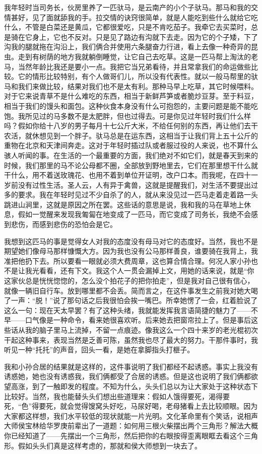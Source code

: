 我年轻时当司务长，伙房里养了一匹驮马，是云南产的小个子驮马。那马和我的交情甚好，见了面就舔我的手。拉交情的诀窍很简单，就是人能吃到些什么就给它吃什么，不管是白菜还是黄瓜，它都很爱吃，只是不肯吃茄子。我牵它去买菜时，总是骑在它身上，它也不反对。只是见了路边有沟就下去走。因为它的个子矮，下了沟我的腿就拖在沟沿上，我们俩合并使用六条腿奋力行进，看上去像一种奇异的昆虫。走到有树荫的地方我就躺倒睡觉，让它自己去吃草。这是一匹马帮上淘汰的老马，当然年龄比我还是要小一点。我把它当兄弟看待，并且常拿我们的命运做些比较。它的情形比较特别，有个人做哥们儿，所以没有代表性。就以一般马帮里的驮马和我们来做比较，结果对我们也不是太有利。那种马早上吃草，其它时候喂料。对于它来说青草不是什么难吃的东西，相当于新鲜芦笋或者脆炒豆芽。至于料豆，相当于我们的馒头和面包。这种伙食本身没有什么可抱怨的，主要问题是能不能吃饱。我所见过的马多数不是太肥胖，但也过得去。可是你见过年轻时我们什么样吗？假如你给十八岁的男子每月十七公斤大米，不给任何别的东西，再让他们去干农活，就休想见到一个胖子。驮马总是在运东西，这相当于让我们背上五十公斤的重物在北京和天津间奔走。这对于年轻时插过队或者服过役的人来说，也不算什么骇人听闻的事。在生活的一个最重要的方面，我们绝对不如它们，就是春天到来的时候，我们那里的马不论公母都不圈，全部放到野地里去，它们在那里想干什么就干什么，用不着送玫瑰花、也用不着到单位开证明，改户口本。而我呢，在四十一岁前没有过性生活。圣人云，人有异于禽兽，这就是提醒我们，对生活不要提出过多的要求。我在年轻时见过不少自杀了的人，就从来没见过一匹马走着走着路一头跳进山涧里，这就是原因之所在罢。这些话的意思是说，我和我的马在草地上休息，假如一觉醒来发现我匍匐在地变成了一匹马，而它变成了司务长，我绝不会感到悲伤，而感到悲伤的恐怕会是它。 

我想到这匹马的事是觉得女人对我的态度没有母马对它的态度好。当然，我也不是期望她们像母马那样慷慨大方。因为我也没有公马那样善良，谁要骑在我背上，我准把他扔下去。所以要看一眼就必须大费周章，这也算合情合理。何况人家小孙也不是让我光看看，还有下文。我这个人一贯会漏掉上文，用她的话来说，就是“你这家伙总是恍恍惚惚的，怎么没个拍花子的把你拍走”，但是我对自己很有信心，就像一辆旧自行车。放到哪里都不会丢。简而言之，在这件事发生之前我对她大喝了一声：“脱！”说了那句话之后我很怕会挨一嘴巴。所幸她愣了一会，红着脸说了这么一句：现在天太早罢？有了这种头绪，我就能发挥我言语简捷的魅力了——不早——口气像是一种命令，看来她很喜欢听。后来她去把窗帘拉上了。但是事后这些话从我的脑子里马上流掉，不留一点痕迹。像我这么一个四十来岁的老光棍初次干起这种事来，表现当然是乏善可陈，虽然我也尽了最大的努力。干那件事时，我听见一种“托托”的声音，回头一看，是她在拿脚指头打榧子。 

我和小孙合居的结果就是这样的，这件事说明了我们都经不起诱惑。事实上我没有诱惑她，她也没有诱惑我，我们俩都受了合居的诱惑。但是这也说明了我们俩都欲望高涨，到了一触即发的程度。不知为什么，头头们总以为让大家处于这种状态下比较好。当然，我也能替头头们想出些道理来：假如人饿得要死，渴得要死，“色”得要死，就会觉得馊窝头好吃，马尿好喝，老母猪看上去比较顺眼。因为大家都这样想，我们水平较低的现状就能一片光明。文化革命里有个笑话，说相声大师侯宝林给华罗庚前辈出了一道题：如何用三根火柴摆出两个三角形？解法大概你已经知道了——先摆出一个三角形，然后把你的右眼按得歪离眼眶去看这个三角形。假如头头们真是这样考虑的，那就和侯大师想到一块去了。 

